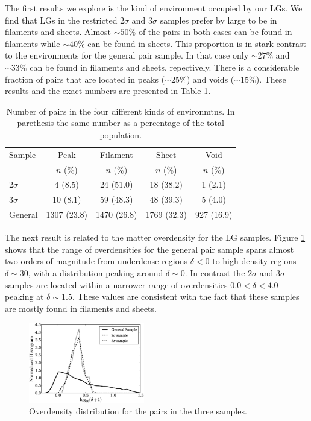 \documentclass{emulateapj}
\begin{document}
The first results we explore is the kind of environment occupied by
our LGs. We find that LGs in the restricted $2\sigma$ and $3\sigma$
samples prefer by large to be in filaments and sheets. Almost $\sim 50\%$ of the
pairs in both cases can be found in filaments while $\sim 40\%$ can be
found in sheets. This proportion is in stark contrast to the
environments for the general pair sample. In that case only $\sim
27\%$ and $\sim 33\%$ can be found in filaments and sheets,
repectively. There is a considerable fraction of pairs that are
located in peaks ($\sim 25\%$) and voids ($\sim 15\%$). These results
and the exact numbers are presented in Table \ref{table:web_type}.


\begin{table}
\begin{center}
\begin{tabular}{lcccc}\hline\hline
Sample & Peak & Filament & Sheet & Void\\
       & $n$ (\%) & $n$ (\%) & $n$ (\%) & $n$ (\%) \\\hline
2$\sigma$ & 4 (8.5) & 24 (51.0) &  18 (38.2) & 1 (2.1)\\
3$\sigma$ & 10 (8.1) & 59 (48.3) & 48 (39.3) & 5 (4.0)\\  
General & 1307 (23.8) & 1470 (26.8) & 1769 (32.3) & 927 (16.9)\\\hline
\end{tabular}
\caption{
Number of pairs in the four different kinds of environmtns. In
parethesis the same number as a percentage of the
total population. 
\label{table:web_type}}
\end{center}
\end{table}



The next result is related to the matter overdensity for the LG
samples. Figure \ref{fig:density} shows that the range of
overdensities for the general pair sample spans almost two orders of
magnitude from underdense regions $\delta<0$ to high density regions
$\delta\sim 30$, with a distribution peaking around $\delta \sim
0$. In contrast the $2\sigma$ and $3\sigma$ samples are located within
a narrower range of overdensities $0.0<\delta<4.0$ peaking at $\delta
\sim 1.5$. These values are consistent with the fact that these
samples are mostly found in filaments and sheets. 

\begin{figure}
\begin{center}
  \includegraphics[width=0.45\textwidth]{density_histogram.eps}
\end{center}
\caption{Overdensity distribution for the pairs in the three samples.
    \label{fig:density}}  
\end{figure}
\end{document}
